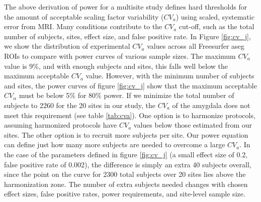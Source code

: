 The above derivation of power for a multisite study defines hard thresholds for the amount of acceptable scaling factor variability ($CV_{a}$) using scaled, systematic error from MRI. Many conditions contribute to the $CV_{a}$ cut-off, such as the total number of subjects, sites, effect size, and false positive rate. In Figure \ref{fig:cv_j}, we show the distribution of experimental $CV_{a}$ values across all Freesurfer aseg ROIs to compare with power curves of various sample sizes. The maximum $CV_{a}$ value is 9\%, and with enough subjects and sites, this falls well below the maximum acceptable $CV_{a}$ value. However, with the minimum number of subjects and sites, the power curves of figure \ref{fig:cv_j} show that the maximum acceptable $CV_{\alpha}$ must be below 5\% for 80\% power. If we minimize the total number of subjects to 2260 for the 20 sites in our study, the $CV_{a}$ of the amygdala does not meet this requirement (see table \ref{tab:cva}). One option is to harmonize protocols, assuming harmonized protocols have $CV_a$ values below those estimated from our sites. The other option is to recruit more subjects per site. Our power equation can define just how many more subjects are needed to overcome a large $CV_a$. In the case of the parameters defined in figure \ref{fig:cv_j} (a small effect size of 0.2, false positive rate of 0.002), the difference is simply an extra 40 subjects overall, since the point on the curve for 2300 total subjects over 20 sites lies above the harmonization zone. The number of extra subjects needed changes with chosen effect sizes, false positive rates, power requirements, and site-level sample size. 

